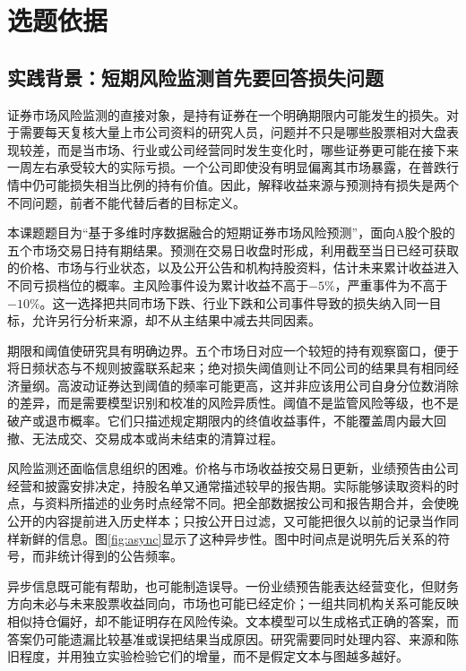 \chapter{选题依据}
\section{实践背景：短期风险监测首先要回答损失问题}
证券市场风险监测的直接对象，是持有证券在一个明确期限内可能发生的损失。对于需要每天复核大量上市公司资料的研究人员，问题并不只是哪些股票相对大盘表现较差，而是当市场、行业或公司经营同时发生变化时，哪些证券更可能在接下来一周左右承受较大的实际亏损。一个公司即使没有明显偏离其市场暴露，在普跌行情中仍可能损失相当比例的持有价值。因此，解释收益来源与预测持有损失是两个不同问题，前者不能代替后者的目标定义。

本课题题目为“基于多维时序数据融合的短期证券市场风险预测”，面向A股个股的五个市场交易日持有期结果。预测在交易日收盘时形成，利用截至当日已经可获取的价格、市场与行业状态，以及公开公告和机构持股资料，估计未来累计收益进入不同亏损档位的概率。主风险事件设为累计收益不高于$-5\%$，严重事件为不高于$-10\%$。这一选择把共同市场下跌、行业下跌和公司事件导致的损失纳入同一目标，允许另行分析来源，却不从主结果中减去共同因素。

期限和阈值使研究具有明确边界。五个市场日对应一个较短的持有观察窗口，便于将日频状态与不规则披露联系起来；绝对损失阈值则让不同公司的结果具有相同经济量纲。高波动证券达到阈值的频率可能更高，这并非应该用公司自身分位数消除的差异，而是需要模型识别和校准的风险异质性。阈值不是监管风险等级，也不是破产或退市概率。它们只描述规定期限内的终值收益事件，不能覆盖周内最大回撤、无法成交、交易成本或尚未结束的清算过程。

风险监测还面临信息组织的困难。价格与市场收益按交易日更新，业绩预告由公司经营和披露安排决定，持股名单又通常描述较早的报告期。实际能够读取资料的时点，与资料所描述的业务时点经常不同。把全部数据按公司和报告期合并，会使晚公开的内容提前进入历史样本；只按公开日过滤，又可能把很久以前的记录当作同样新鲜的信息。图\ref{fig:async}显示了这种异步性。图中时间点是说明先后关系的符号，而非统计得到的公告频率。


异步信息既可能有帮助，也可能制造误导。一份业绩预告能表达经营变化，但财务方向未必与未来股票收益同向，市场也可能已经定价；一组共同机构关系可能反映相似持仓偏好，却不能证明存在风险传染。文本模型可以生成格式正确的答案，而答案仍可能遗漏比较基准或误把结果当成原因。研究需要同时处理内容、来源和陈旧程度，并用独立实验检验它们的增量，而不是假定文本与图越多越好。

